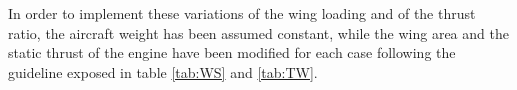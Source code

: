 %
\noindent
In order to implement these variations of the wing loading and of the thrust ratio, the aircraft weight has been assumed constant, while the wing area and the static thrust of the engine have been modified for each case following the guideline exposed in table \ref{tab:WS} and \ref{tab:TW}.

